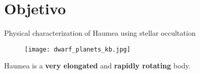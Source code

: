 \section{Objetivo} %

\label{sec:intro}

\begin{frame}[c]{}{}

	\begin{block}{}
		Physical characterization of Haumea using stellar occultation 
	\end{block}


	\begin{figure}[tb]
		\centering
		\texttt{[image: dwarf\_planets\_kb.jpg]}
	\end{figure}




	
Haumea is a \textbf{very elongated} and \textbf{rapidly rotating} body.
	
\end{frame}

